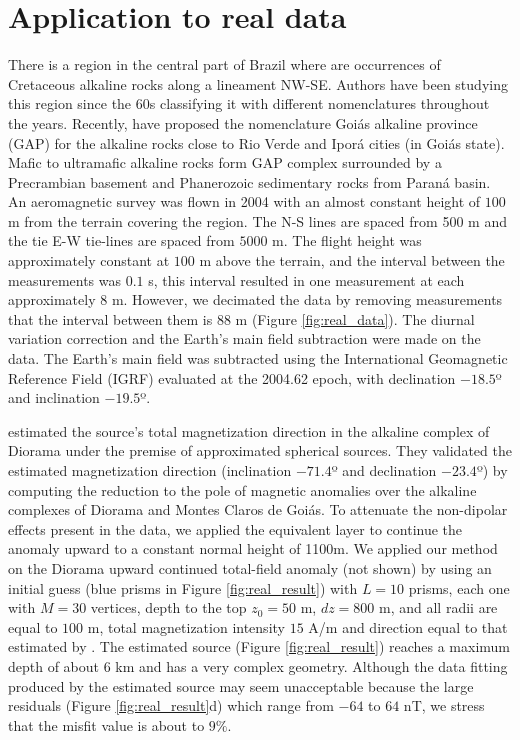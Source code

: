 \documentclass[extra,mreferee]{gji}
\begin{document}
\section{Application to real data}

There is a region in the central part of Brazil where are occurrences of Cretaceous alkaline rocks along a lineament NW-SE. Authors have been studying this region since the 60s classifying it with different nomenclatures throughout the years. Recently, \cite{Junqueira-BrodTerezaCristina2002Apad} have proposed the nomenclature Goiás alkaline province (GAP) for the alkaline rocks close to Rio Verde and Iporá cities (in Goiás state). Mafic to ultramafic alkaline rocks form GAP complex surrounded by a Precrambian basement and Phanerozoic sedimentary rocks from Paraná basin. An aeromagnetic survey was flown in 2004 with an almost constant height of $100$ m from the terrain covering the region.  The N-S lines are spaced from 500 m and the tie E-W tie-lines are spaced from $5000$ m. The flight height was approximately constant at $100$ m above the terrain, and the interval between the measurements was $0.1$ s, this interval resulted in one measurement at each approximately $8$ m. However, we decimated the data by removing measurements that the interval between them is 88 m (Figure \ref{fig:real_data}). The diurnal variation correction and the Earth's main field subtraction were made on the data. The Earth's main field was subtracted using the International Geomagnetic Reference Field (IGRF) evaluated at the 2004.62 epoch, with declination $-18.5$º and inclination $-19.5$º.

\cite{OliveiraV2015Eott} estimated the source's total magnetization direction in the alkaline complex of Diorama under the premise of approximated spherical sources. They validated the estimated magnetization direction (inclination $-71.4$º and declination $-23.4$º) by computing the reduction to the pole of magnetic anomalies over the alkaline complexes of Diorama and Montes Claros de Goiás. To attenuate the non-dipolar effects present in the data, we applied the equivalent layer \citep{DampneyC.N.G.1969Test,EmiliaDavidA.1973Esua} to continue the anomaly upward to a constant normal height of 1100m. We applied our method on the Diorama upward continued total-field anomaly (not shown) by using an initial guess (blue prisms in Figure \ref{fig:real_result}) with $L=10$ prisms, each one with $M=30$ vertices, depth to the top $z_0=50$ m, $dz = 800$ m, and all radii are equal to $100$ m, total magnetization intensity $15$ A/m and direction equal to that estimated by \cite{OliveiraV2015Eott}. The estimated source (Figure \ref{fig:real_result}) reaches a maximum depth of about 6 km and has a very complex geometry. Although the data fitting produced by the estimated source may seem unacceptable because the large residuals (Figure \ref{fig:real_result}d) which range from $-64$ to $64$ nT, we stress that the misfit value is about to $9\%$.
\end{document}
